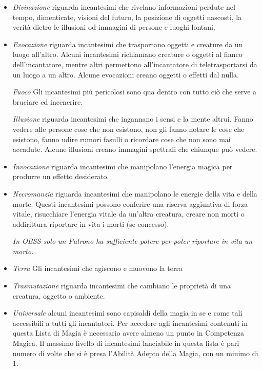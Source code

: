 \begin{multicols}{2}
\begin{itemize}[leftmargin=*]
\item
\emph{Divinazione} riguarda incantesimi che rivelano informazioni perdute nel tempo, dimenticate, visioni del futuro, la posizione di oggetti nascosti, la verità dietro le illusioni od immagini di persone e luoghi lontani.

\item
\emph{Evocazione} riguarda incantesimi che trasportano oggetti e creature da un luogo all'altro. Alcuni incantesimi richiamano creature o oggetti al fianco dell'incantatore, mentre altri permettono all'incantatore di teletrasportarsi da un luogo a un altro. Alcune evocazioni creano oggetti o effetti dal nulla.

\emph{Fuoco} Gli incantesimi più pericolosi sono qua dentro con tutto ciò che serve a bruciare ed incenerire.

\emph{Illusione} riguarda incantesimi che ingannano i sensi e la mente altrui. Fanno vedere alle persone cose che non esistono, non gli fanno notare le cose che esistono, fanno udire rumori fasulli o ricordare cose che non sono mai accadute. Alcune illusioni creano immagini spettrali che chiunque può vedere.

\item
\emph{Invocazione} riguarda incantesimi che manipolano l'energia magica per produrre un effetto desiderato.

\item
\emph{Necromanzia} riguarda incantesimi che manipolano le energie della vita e della morte. Questi incantesimi possono conferire una riserva aggiuntiva di forza vitale, risucchiare l'energia vitale da un'altra creatura, creare non morti o addirittura riportare in vita i morti (se concesso).

\emph{In OBSS solo un Patrono ha sufficiente potere per poter riportare in vita un morto}.

\item
\emph{Terra} Gli incantesimi che agiscono e muovono la terra

\item
\emph{Trasmutazione} riguarda incantesimi che cambiano le proprietà di una creatura, oggetto o ambiente.

\item
\emph{Universale} alcuni incantesimi sono capisaldi della magia in se e come tali accessibili a tutti gli incantatori. Per accedere agli incantesimi contenuti in questa Lista di Magia è necessario avere almeno un punto in Competenza Magica. Il massimo livello di incantesimi lanciabile in questa lista è pari numero di volte che si è presa l'Abilità Adepto della Magia, con un minimo di 1.


\end{itemize}
\end{multicols}
